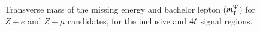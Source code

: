 \begin{appendices}
\begin{figure}[htb]
{  }
   \\
  \caption{Transverse mass of the missing energy and bachelor lepton ($m_{\mathrm{T}}^W$) for $Z+e$ and $Z+\mu$ candidates, for the inclusive and $4\ell$ signal regions.}
  \label{fig:SR-mTW-1}
\end{figure}

\clearpage


\end{appendices}
